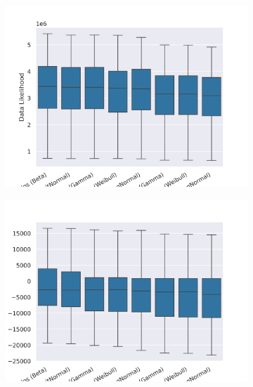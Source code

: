 \documentclass[10pt,letterpaper]{article}
\begin{document}
\begin{figure}[h!]
	\begin{subfigure}[b]{0.45\textwidth}
		\centering
		\includegraphics[width=\textwidth]{figures/yule-400-ccd1-likelihood.png}
	\end{subfigure}
	\begin{subfigure}[b]{0.45\textwidth}
		\centering
		\includegraphics[width=\textwidth]{figures/bio-ccd1-likelihood.png}
	\end{subfigure}
	
	\label{fig:data-likelihood}
\end{figure}
\end{document}

